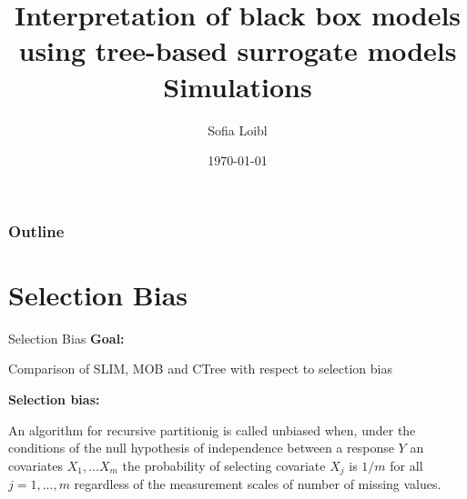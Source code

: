 \documentclass[9pt, xcolor=table]{beamer}
\title[Interpretation of black box models]{Interpretation of black box models using tree-based surrogate models \newline \small{Simulations}}
\author[Sofia Loibl]{Sofia Loibl}
\institute[LMU]{LMU München}
\date{\today}
\begin{document}
\begin{frame}
\titlepage 
\end{frame}


\begin{frame}
\frametitle{Outline} 
\tableofcontents 
\end{frame}

\section{Selection Bias}
\begin{frame}{Selection Bias}
\textbf{Goal:} 

Comparison of SLIM, MOB and CTree with respect to selection bias
\vspace{0.5cm}


\textbf{Selection bias:} 

An algorithm for recursive partitionig is called unbiased when, under the conditions of the null hypothesis of independence between a response $Y$ an covariates $X_{1},...X_{m}$ the probability of selecting covariate $X_{j}$ is $1/m$ for all $j = 1,...,m$ regardless of the measurement scales of number of missing values. \citep{Hothorn.2006}

\end{frame}
\end{document}
